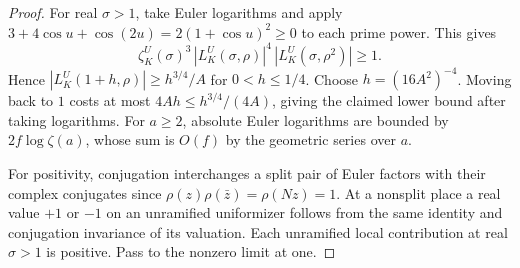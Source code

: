 \documentclass[a4paper,11pt]{article}
\theoremstyle{definition}
\theoremstyle{remark}
\numberwithin{equation}{section}
\begin{document}
\begin{proof}
For real \(\sigma>1\), take Euler logarithms and apply
\(3+4\cos u+\cos(2u)=2(1+\cos u)^2\ge0\) to each prime
power. This gives
\[
  \zeta_K^U(\sigma)^3\,|L_K^U(\sigma,\rho)|^4\,
                |L_K^U(\sigma,\rho^2)|\ge1 .
\]
Hence \(|L_K^U(1+h,\rho)|\ge h^{3/4}/A\) for \(0<h\le1/4\).
Choose \(h=(16A^2)^{-4}\). Moving back to \(1\) costs at most
\(4Ah\le h^{3/4}/(4A)\), giving the claimed lower bound after
taking logarithms. For \(a\ge2\), absolute Euler logarithms
are bounded by \(2f\log\zeta(a)\), whose sum is \(O(f)\) by
the geometric series over \(a\).

For positivity, conjugation interchanges a split pair of Euler
factors with their complex conjugates since
\(\rho(z)\rho(\bar z)=\rho(Nz)=1\). At a nonsplit place a
real value \(+1\) or \(-1\) on an unramified uniformizer
follows from the same identity and conjugation invariance of
its valuation. Each unramified local contribution at real
\(\sigma>1\) is positive. Pass to the nonzero limit at one.
\end{proof}
\end{document}
